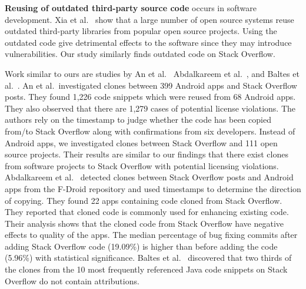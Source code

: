 \documentclass[10pt,journal,compsoc]{IEEEtran}
\begin{document}
\textbf{Reusing of outdated third-party source code} occurs 
in software development. Xia et al.~\cite{Xia2014} show that 
a large number of open source systems reuse outdated third-party 
libraries from popular open source projects. Using the outdated 
code give detrimental effects to the software since they may 
introduce vulnerabilities. Our study similarly finds
outdated code on Stack Overflow.

Work similar to ours are studies by An et al.~\cite{An2017}
Abdalkareem et al.~\cite{Abdalkareem2017}, and Baltes et al.~\cite{Baltes2017}. 
An et al.~investigated clones
between 399 Android apps and Stack Overflow posts. They found 1,226 code
snippets which were reused from 68 Android apps. They also observed that there
are 1,279 cases of potential license violations. The authors rely on the
timestamp to judge whether the code has been copied from/to Stack Overflow along
with confirmations from six developers. Instead of Android apps, we investigated
clones between Stack Overflow and 111 open source projects. Their results are
similar to our findings that there exist clones from software projects to Stack
Overflow with potential licensing violations. Abdalkareem et
al.~\cite{Abdalkareem2017} detected clones between Stack Overflow posts and
Android apps from the F-Droid repository and used timestamps to
determine the direction
of copying. They found 22 apps containing code cloned from Stack Overflow. They
reported that cloned code is commonly used for enhancing existing code. Their
analysis shows that the cloned code from Stack Overflow have negative effects to
quality of the apps. The median percentage of bug fixing commits after adding
Stack Overflow code (19.09\%) is higher than before adding the code (5.96\%)
with statistical significance.
Baltes et al.~\cite{Baltes2017} discovered that two
thirds of the clones from the 10 most frequently referenced Java code snippets on Stack
Overflow do not contain attributions.
\end{document}
